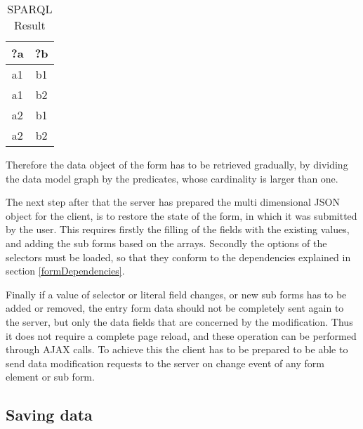 \begin{table}

	\begin{center}
		\begin{tabular}{||c | c||} 
			\hline
			?a & ?b  \\ [0.5ex] 
			\hline\hline
			a1 & b1 \\ 
			\hline
			a1 & b2 \\
			\hline
			a2 & b1 \\
			\hline
			a2 & b2 \\ [1ex] 
			\hline 
		\end{tabular}
	\end{center}
	\caption{SPARQL Result}  \label{sparqlResult}
\end{table}


Therefore the data object of the form has to be retrieved gradually, by dividing the data model graph by the predicates, whose cardinality is larger than one.

The next step after that the server has prepared the multi dimensional JSON object for the client, is to restore the state of the form, in which it was submitted by the user. This requires firstly the filling of the fields with the existing values, and adding the sub forms based on the arrays. Secondly the options of the selectors must be loaded, so that they conform to the dependencies explained in section \ref{formDependencies}. 

Finally if a value of selector or literal field changes, or new sub forms has to be added or removed, the entry form data should not be completely sent again to the server, but only the data fields that are concerned by the modification. Thus it does not require a complete page reload, and these operation can be performed through AJAX calls. To achieve this the client has to be prepared to be able to send data modification requests to the server on change event of any form element or sub form.

\subsection{Saving data}













